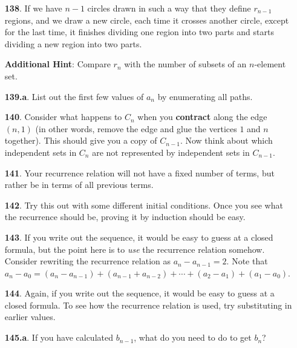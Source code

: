 \documentclass[10pt,]{book}
\newcommand{\terminology}[1]{\textbf{#1}}
\theoremstyle{plain}
\theoremstyle{definition}
\theoremstyle{definition}
\theoremstyle{definition}
\numberwithin{equation}{chapter}
\begin{document}
\begin{itemize}[itemsep=1em]
\item[\textbf{138}.]\hypertarget{p-902}{}%
If we have \(n - 1\) circles drawn in such a way that they define \(r_{n-1}\) regions, and we draw a new circle, each time it crosses another circle, except for the last time, it finishes dividing one region into two parts and starts dividing a new region into two parts.%

\par\smallskip
\noindent\textbf{Additional Hint}: \hypertarget{p-903}{}%
Compare \(r_n\) with the number of subsets of an \(n\)-element set.%

\item[\textbf{139.a}.]\hypertarget{p-909}{}%
List out the first few values of \(a_n\) by enumerating all paths.%

\item[\textbf{140}.]\hypertarget{p-912}{}%
Consider what happens to \(C_n\) when you \terminology{contract} along the edge \((n,1)\) (in other words, remove the edge and glue the vertices \(1\) and \(n\) together).  This should give you a copy of \(C_{n-1}\).  Now think about which independent sets in \(C_n\) are not represented by independent sets in \(C_{n-1}\).%

\item[\textbf{141}.]\hypertarget{p-915}{}%
Your recurrence relation will not have a fixed number of terms, but rather be in terms of all previous terms.%

\item[\textbf{142}.]\hypertarget{p-919}{}%
Try this out with some different initial conditions.  Once you see what the recurrence should be, proving it by induction should be easy.%

\item[\textbf{143}.]\hypertarget{p-923}{}%
If you write out the sequence, it would be easy to guess at a closed formula, but the point here is to \emph{use} the recurrence relation somehow.  Consider rewriting the recurrence relation as \(a_n - a_{n-1} = 2\).  Note that \(a_n - a_0 = (a_n - a_{n-1}) + (a_{n-1} + a_{n-2}) + \cdots + (a_2 - a_1) + (a_1 - a_0)\).%

\item[\textbf{144}.]\hypertarget{p-925}{}%
Again, if you write out the sequence, it would be easy to guess at a closed formula.  To see how the recurrence relation is used, try substituting in earlier values.%

\item[\textbf{145.a}.]\hypertarget{p-931}{}%
If you have calculated \(b_{n-1}\), what do you need to do to get \(b_n\)?%


\end{itemize}
\end{document}
